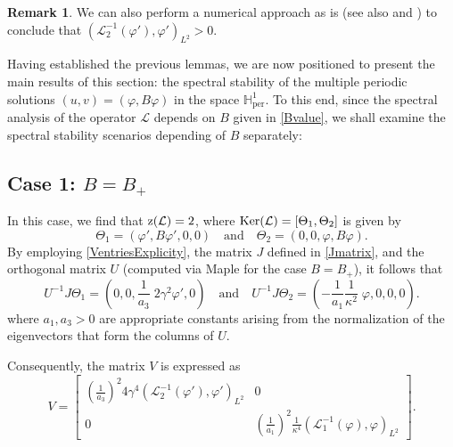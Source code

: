 \documentclass[10pt,reqno,a4paper]{amsart} %
\theoremstyle{definition} %
\numberwithin{equation}{section}
\numberwithin{figure}{section}
\newtheorem{remark}[theorem]{Remark}
\begin{document}
\begin{remark}
We can also perform a numerical approach as is \cite[Section 3]{NataliCardosoAmaral} (see also \cite{BittencourtLoreno2022} and \cite{NataliMoraesLorenoPastor}) to conclude that $(\mathcal{L}_2^{-1}(\varphi'), \varphi')_{L^2}>0$. 
\end{remark}

Having established the previous lemmas, we are now positioned to present the main results of this section: the spectral stability of the multiple periodic solutions $(u,v) = (\varphi, B\varphi)$ in the space $\mathbb{H}^1_{\text{per}}$. To this end, since the spectral analysis of the operator $\mathcal{L}$ depends on $B$ given in \eqref{Bvalue}, we shall examine the spectral stability scenarios depending of $B$ separately:

\subsection*{Case 1: $B = B_+$} 
In this case, we find that ${\rm z}(\mathcal{L}) = 2$, where ${\rm Ker}(\mathcal{L}) = [\Theta_1, \Theta_2]$ is given by
\begin{equation*}
    \Theta_1 = (\varphi', B\varphi', 0, 0) \quad \text{and} \quad \Theta_2 = (0, 0, \varphi, B\varphi).
\end{equation*}
By employing \eqref{VentriesExplicity}, the matrix $J$ defined in \eqref{Jmatrix}, and the orthogonal matrix $U$ (computed via Maple for the case $B = B_+$), it follows that
$$
U^{-1}J \Theta_1 = \left( 0,0, \frac{1}{a_3}\;2\gamma^2 \varphi',0  \right)  \quad \text{and} \quad  U^{-1}J \Theta_2 =\left( - \frac{1}{a_1 }\frac{1}{\kappa^2}\; \varphi,0,0,0  \right).
$$
where $a_1,a_3>0$ are appropriate constants arising from the normalization of the eigenvectors that form the columns of $U$.



Consequently, the matrix $V$ is expressed as
\begin{equation*}
    V = \begin{bmatrix}
        \left( \frac{1}{a_3}\right)^2  4 \gamma^4 \left(  \mathcal{L}_2^{-1}(\varphi'), \varphi'\right)_{L^2} & 0 \\
    0 &    \left( \frac{1}{a_1}\right)^2 \frac{1}{\kappa^4} \left(\mathcal{L}_1^{-1} (\varphi), \varphi\right)_{L^2}
    \end{bmatrix}.
\end{equation*}
 
\end{document}

